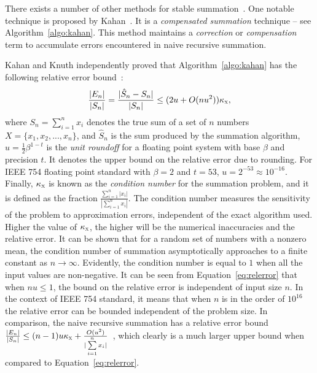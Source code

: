 There exists a number of other methods for stable summation~\cite{numStabBook}. One notable technique is proposed by Kahan~\cite{kahan1965further}. It is a {\em compensated summation} technique -- see Algorithm~\ref{algo:kahan}. This method maintains a {\em correction} or {\em compensation} term to accumulate errors encountered in naive recursive summation. 



Kahan and Knuth independently proved that Algorithm~\ref{algo:kahan} has the following relative error bound~\cite{numStabBook}: 
\begin{equation}
\begin{small}
\label{eq:relerror}
\frac{|E_n|}{|S_n|}=\frac{|\hat{S}_n-S_n|}{|S_n|}\leq (2u+O(nu^2))\condnumber,
\end{small}
\end{equation}
where $S_n=\sum\limits_{i=1}^n x_i$ denotes the true sum of a set of $n$ numbers $X=\{x_1, x_2,...,x_n\}$, and $\hat{S}_n$ is the sum produced by the summation algorithm, $u=\frac{1}{2}\beta^{1-t}$ is the {\em unit roundoff} for a floating point system with base $\beta$ and precision $t$. It denotes the upper bound on the relative error due to rounding. For IEEE 754 floating point standard with $\beta=2$ and $t=53$, $u = 2^{-53}\approx 10^{-16}$. Finally, $\kappa_\textsc{x}$ is known as the {\em condition number} for the summation problem, and it is defined as the fraction $\frac{\sum\limits_{i=1}^n|x_i|}{|\sum\limits_{i=1}^n x_i|}$. The condition number measures the sensitivity of the problem to approximation errors, independent of the exact algorithm used. Higher the value of $\kappa_\textsc{x}$, the higher will be the numerical inaccuracies and the relative error. It can be shown that for a random set of numbers with a nonzero mean, the condition number of summation asymptotically approaches to a finite constant as $n\to\infty$. Evidently, the condition number is equal to $1$ when all the input values are non-negative. It can be seen from Equation~\ref{eq:relerror} that when $nu\leq 1$, the bound on the relative error is independent of input size $n$. In the context of IEEE 754 standard, it means that when $n$ is in the order of $10^{16}$ the relative error can be bounded independent of the problem size. In comparison, the naive recursive summation has a relative error bound $\frac{|E_n|}{|S_n|}\leq (n-1)u\kappa_\textsc{x} +\frac{O(u^2)}{|\sum\limits_{i=1}^n x_i|}$~\cite{numStabBook}, which clearly is a much larger upper bound when compared to Equation~\ref{eq:relerror}.

